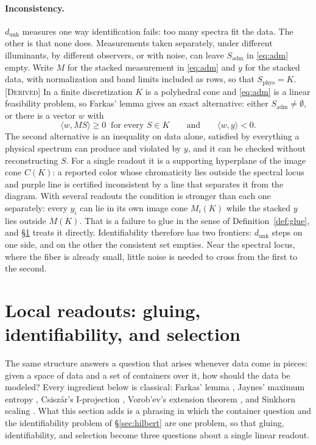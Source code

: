 \documentclass[11pt]{article}
\theoremstyle{boldplain}
\theoremstyle{boldupright}
\newcommand{\derived}{[\textup{\textsc{Derived}}]}
\newcommand{\dunk}{d_{\mathrm{unk}}}
\newcommand{\Sphys}{S_{\mathrm{phys}}}
\newcommand{\Sadm}{S_{\mathrm{adm}}}
\begin{document}
\paragraph{Inconsistency.} $\dunk$ measures one way identification fails: too many spectra fit the data. The
other is that none does. Measurements taken separately, under different illuminants, by different
observers, or with noise, can leave $\Sadm$ in \eqref{eq:adm} empty. Write $M$ for the stacked measurement in
\eqref{eq:adm} and $y$ for the stacked data, with normalization and band limits included as rows, so that $\Sphys=K$.
\derived{} In a finite discretization $K$ is a polyhedral cone and \eqref{eq:adm} is a linear feasibility problem, so
Farkas' lemma \cite{farkas1902} gives an exact alternative: either $\Sadm\neq\emptyset$, or there is a vector $w$ with
\begin{equation}\label{eq:farkas}
\langle w,MS\rangle\ge0\ \text{ for every }S\in K\qquad\text{and}\qquad\langle w,y\rangle<0.
\end{equation}
The second alternative is an inequality on data alone, satisfied by everything a physical spectrum can
produce and violated by $y$, and it can be checked without reconstructing $S$. For a single readout it is a
supporting hyperplane of the image cone $C(K)$: a reported color whose chromaticity lies outside the
spectral locus and purple line is certified inconsistent by a line that separates it from the diagram. With
several readouts the condition is stronger than each one separately: every $y_i$ can lie in its own image
cone $M_i(K)$ while the stacked $y$ lies outside $M(K)$. That is a failure to glue in the sense of
Definition~\ref{def:glue}, and \S\ref{sec:local} treats it directly. Identifiability therefore has two frontiers: $\dunk$ steps on one side,
and on the other the consistent set empties. Near the spectral locus, where the fiber is already small,
little noise is needed to cross from the first to the second.

\section{Local readouts: gluing, identifiability, and selection}\label{sec:local}

The same structure answers a question that arises whenever data come in pieces: given a space of
data and a set of containers over it, how should the data be modeled? Every ingredient below is
classical: Farkas' lemma \cite{farkas1902}, Jaynes' maximum entropy \cite{jaynes1957}, Csisz\'ar's I-projection \cite{csiszar1975},
Vorob'ev's extension theorem \cite{vorobev1962}, and Sinkhorn scaling \cite{sinkhorn1964,cuturi2013}. What this section adds is a
phrasing in which the container question and the identifiability problem of \S\ref{sec:hilbert} are one problem, so
that gluing, identifiability, and selection become three questions about a single linear readout.
\end{document}
